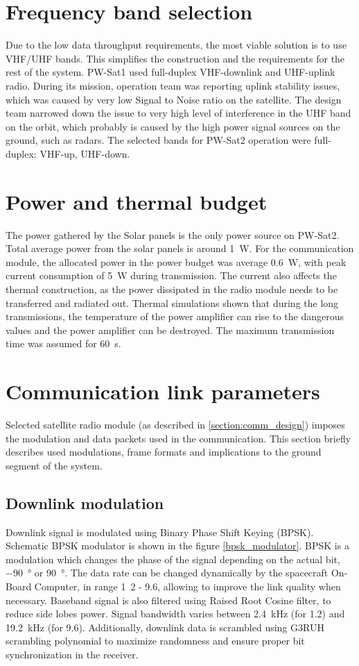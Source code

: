\section{Frequency band selection}
Due to the low data throughput requirements, the most viable solution is to use VHF/UHF bands. This simplifies the construction and the requirements for the rest of the system.
PW-Sat1 \cite{pwsat1_website_ska} used full-duplex VHF-downlink and UHF-uplink radio. During its mission, operation team was reporting uplink stability issues, which was caused by very low Signal to Noise ratio on the satellite. The design team narrowed down the issue to very high level of interference in the UHF band on the orbit, which probably is caused by the high power signal sources on the ground, such as radars. The selected bands for PW-Sat2 operation were full-duplex: VHF-up, UHF-down.

\section{Power and thermal budget}
The power gathered by the Solar panels is the only power source on PW-Sat2. Total average power from the solar panels is around \SI{1}{\watt}. For the communication module, the allocated power in the power budget was average \SI{0.6}{\watt}, with peak current consumption of \SI{5}{\watt} during transmission. The current also affects the thermal construction, as the power dissipated in the radio module needs to be transferred and radiated out. Thermal simulations \cite{PWSAT_TCS_CDR} shown that during the long transmissions, the temperature of the power amplifier can rise to the dangerous values and the power amplifier can be destroyed. The maximum transmission time was assumed for \SI{60}{\second}.

\section{Communication link parameters}
Selected satellite radio module (as described in \autoref{section:comm_design}) imposes the modulation and data packets used in the communication. This section briefly describes used modulations, frame formats and implications to the ground segment of the system.

\subsection{Downlink modulation}
Downlink signal is modulated using Binary Phase Shift Keying (BPSK). Schematic BPSK modulator is shown in the figure \ref{bpsk_modulator}. BPSK is a modulation which changes the phase of the signal depending on the actual bit, \SI{-90}{\degree} or \SI{90}{\degree}. The data rate can be changed dynamically by the spacecraft On-Board Computer, in range \si{1.2} - \SI{9.6}{\kbps}, allowing to improve the link quality when necessary. Baseband signal is also filtered using Raised Root Cosine filter, to reduce side lobes power. Signal bandwidth varies between \SI{2.4}{\kHz} (for \SI{1.2}{\kbps}) and \SI{19.2}{\kHz} (for \SI{9.6}{\kbps}). Additionally, downlink data is scrambled using G3RUH scrambling polynomial to maximize randomness and ensure proper bit synchronization in the receiver.

